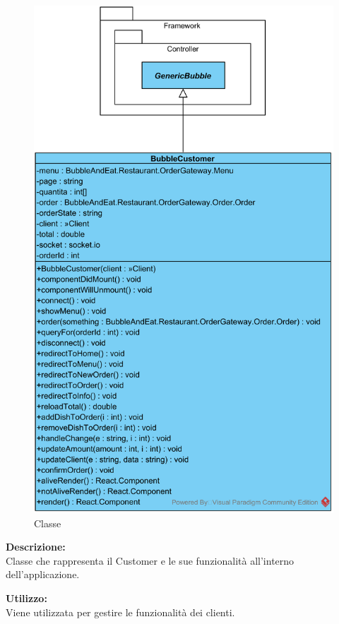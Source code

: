 \paragraph[::BubbleCustomer]{\class}\mbox{}\\ \label{\class}
\begin{figure}[H]
	\centering
	\includegraphics[width=12cm]{./diagrammi/demo/client/customer/bubblecustomer.png}
	\caption{Classe \class}
\end{figure}
\textbf{Descrizione:}\\
Classe che rappresenta il Customer e le sue funzionalità all'interno dell'applicazione.

\textbf{Utilizzo:}\\
Viene utilizzata per gestire le funzionalità dei clienti.

